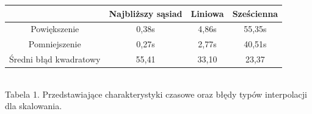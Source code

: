 \documentclass[14pt]{article}
\begin{document}
\begin{center}
    \vspace{0.25cm}
    \begin{tabular}{|c|c|c|c|}
        \hline
        & Najbliższy sąsiad & Liniowa & Sześcienna  \\ \hline
        Powiększenie & 0,38s & 4,86s & 55,35s \\ \hline
        Pomniejszenie & 0,27s & 2,77s & 40,51s \\ \hline
        Średni błąd kwadratowy & 55,41 & 33,10 & 23,37 \\ \hline

    \end{tabular}
    \vspace{0.2cm}
    \\ \small Tabela 1. Przedstawiające charakterystyki 
    czasowe oraz błędy typów interpolacji dla skalowania.
\end{center}
\end{document}
